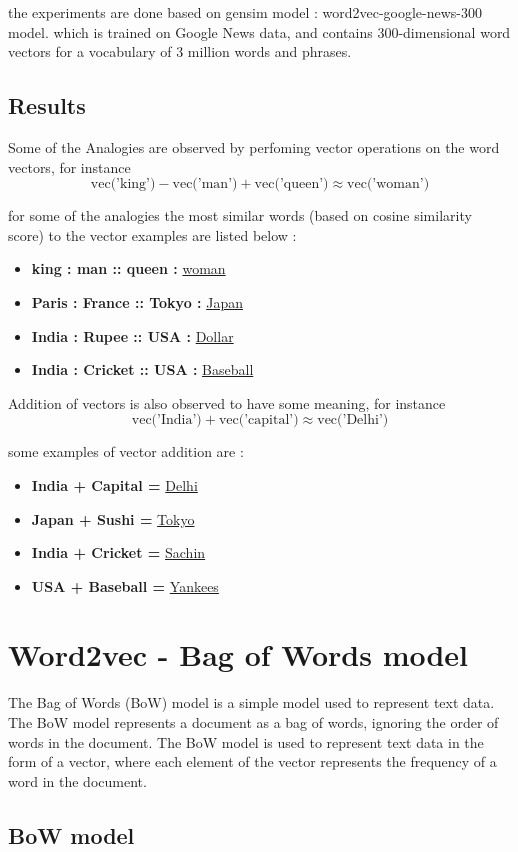 the experiments are done based on gensim model : word2vec-google-news-300 model.
which is trained on Google News data, and contains 300-dimensional word vectors for a vocabulary of 3 million words and phrases.

\subsection{Results}
Some of the Analogies are observed by perfoming vector operations on the word vectors, for instance 
$$
    \text{vec('king')} - \text{vec('man')} + \text{vec('queen')} \approx \text{vec('woman')}
$$

for some of the analogies the most similar words (based on cosine similarity score) to the vector examples are listed below :

\begin{itemize}
    \item {\bf king : man :: queen : } \underline{ woman }
    \item {\bf Paris : France :: Tokyo : } \underline{ Japan }
    \item {\bf India : Rupee :: USA : } \underline{ Dollar }
    \item {\bf India : Cricket :: USA : } \underline{ Baseball }
\end{itemize}

Addition of vectors is also observed to have some meaning, for instance
$$
    \text{vec('India')} + \text{vec('capital')} \approx \text{vec('Delhi')}
$$

some examples of vector addition are :
\begin{itemize}
    \item {\bf India + Capital = } \underline{ Delhi }
    \item {\bf Japan + Sushi = } \underline{ Tokyo }
    \item {\bf India + Cricket = } \underline{ Sachin }
    \item {\bf USA + Baseball = } \underline{ Yankees }
\end{itemize}



\section{Word2vec - Bag of Words model}

The Bag of Words (BoW) model is a simple model used to represent text data. The BoW model represents a document as a bag of words, ignoring the order of words in the document. 
The BoW model is used to represent text data in the form of a vector, where each element of the vector represents the frequency of a word in the document.

\subsection{BoW model} 
